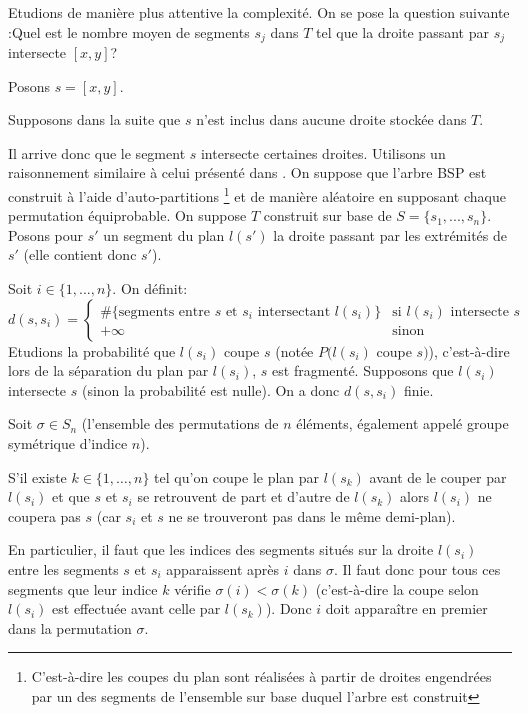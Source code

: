 Etudions de manière plus attentive la complexité. On se pose la
question suivante :\og Quel est le nombre moyen de segments
$s_j$ dans $T$ tel que la droite passant par $s_j$ intersecte
$[x,y]$?\fg

Posons $s = [x,y]$.

Supposons dans la suite que $s$ n'est inclus dans aucune droite
stockée dans $T$.

Il arrive donc que le segment $s$ intersecte certaines droites.
Utilisons un raisonnement similaire à celui présenté dans
\cite{berg_cheong_kreveld_2008}. On suppose que
l'arbre BSP est construit à l'aide d'auto-partitions
\footnote{
  C'est-à-dire les coupes du plan sont réalisées à partir de
  droites engendrées par un des segments de l'ensemble sur
  base duquel l'arbre est construit}
et de manière aléatoire en supposant chaque permutation
équiprobable. On suppose $T$ construit sur base de
$S = \{s_1,...,s_n\}$. Posons pour $s'$ un segment du plan $l(s')$
la droite passant par les extrémités de $s'$ (elle contient donc
$s'$).

Soit $ i \in \{1,...,n\}$. On définit:
$$ d(s,s_i )= \begin{cases}
  \mbox{\#\{segments entre } s \mbox{ et } s_i
  \mbox{ intersectant } l(s_i) \mbox{\}}
  &\mbox{si } l(s_i) \mbox { intersecte } s \\
  +\infty & \mbox{sinon} \end{cases} $$
Etudions la probabilité que $l(s_i)$ coupe $s$ (notée
$P(l(s_i)$ coupe $s)$), c'est-à-dire lors de la séparation du
plan par $l(s_i)$, $s$ est fragmenté. Supposons que $l(s_i)$ intersecte
$s$ (sinon la probabilité est nulle). On a donc $d(s, s_i)$ finie.

Soit $\sigma  \in S_n $ (l'ensemble des permutations de $n$
éléments, également appelé groupe symétrique d'indice $n$).

S'il existe $k\in\{1, \ldots, n\} $ tel qu'on coupe le plan par
$l(s_k)$ avant de le couper par $l(s_i)$ et que $s$ et $s_i$ se
retrouvent de part et d'autre de $l(s_k)$ alors $l(s_i)$ ne
coupera pas $s$ (car $s_i$ et $s$ ne se trouveront pas dans le
même demi-plan).

En particulier, il faut que les indices des segments situés sur
la droite $l(s_i)$ entre les segments $s$ et $s_i$ apparaissent
après $i$ dans $\sigma$. Il faut donc pour
tous ces segments que leur indice $k$ vérifie
$\sigma(i)<\sigma(k)$ (c'est-à-dire la coupe selon
$l(s_i)$ est effectuée avant celle par $l(s_k)$). Donc $i$ doit
apparaître en premier dans la permutation $\sigma$.

